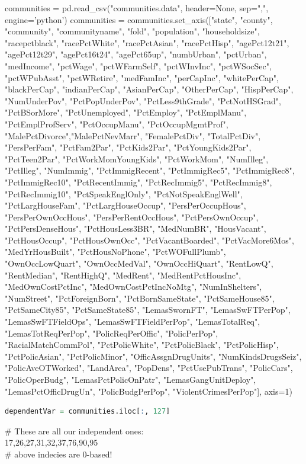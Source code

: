 \documentclass[10pt,a4paper]{article}
\begin{document}
communities = pd.read\_csv("communities.data", header=None, sep=",", engine='python')
communities = communities.set\_axis(["state", "county", "community", "communityname", "fold", "population", "householdsize", "racepctblack", "racePctWhite", "racePctAsian",
"racePctHisp", "agePct12t21", "agePct12t29", "agePct16t24", "agePct65up", "numbUrban", "pctUrban", "medIncome", "pctWage", "pctWFarmSelf", 
"pctWInvInc", "pctWSocSec", "pctWPubAsst", "pctWRetire", "medFamInc", "perCapInc",
"whitePerCap", "blackPerCap", "indianPerCap", "AsianPerCap", "OtherPerCap", "HispPerCap", "NumUnderPov", "PctPopUnderPov", "PctLess9thGrade",
"PctNotHSGrad", "PctBSorMore", "PctUnemployed", "PctEmploy", "PctEmplManu", "PctEmplProfServ", "PctOccupManu", "PctOccupMgmtProf", "MalePctDivorce","MalePctNevMarr", "FemalePctDiv", "TotalPctDiv", "PersPerFam", "PctFam2Par", "PctKids2Par", "PctYoungKids2Par", "PctTeen2Par", "PctWorkMomYoungKids",
"PctWorkMom", "NumIlleg", "PctIlleg", "NumImmig", "PctImmigRecent", "PctImmigRec5", "PctImmigRec8", "PctImmigRec10", "PctRecentImmig", "PctRecImmig5",
"PctRecImmig8", "PctRecImmig10", "PctSpeakEnglOnly", "PctNotSpeakEnglWell", "PctLargHouseFam", "PctLargHouseOccup", "PersPerOccupHous", "PersPerOwnOccHous",
"PersPerRentOccHous", "PctPersOwnOccup", "PctPersDenseHous", "PctHousLess3BR", "MedNumBR", "HousVacant", "PctHousOccup", "PctHousOwnOcc", "PctVacantBoarded", 
"PctVacMore6Mos", "MedYrHousBuilt", "PctHousNoPhone", "PctWOFullPlumb", "OwnOccLowQuart", "OwnOccMedVal", "OwnOccHiQuart", "RentLowQ", "RentMedian",
"RentHighQ", "MedRent", "MedRentPctHousInc", "MedOwnCostPctInc", "MedOwnCostPctIncNoMtg", "NumInShelters", "NumStreet", "PctForeignBorn", "PctBornSameState",
"PctSameHouse85", "PctSameCity85", "PctSameState85", "LemasSwornFT", "LemasSwFTPerPop", "LemasSwFTFieldOps", "LemasSwFTFieldPerPop", "LemasTotalReq", 
"LemasTotReqPerPop", "PolicReqPerOffic", "PolicPerPop", "RacialMatchCommPol", "PctPolicWhite", "PctPolicBlack", "PctPolicHisp", "PctPolicAsian", 
"PctPolicMinor", "OfficAssgnDrugUnits", "NumKindsDrugsSeiz", "PolicAveOTWorked", "LandArea", "PopDens", "PctUsePubTrans", "PolicCars", "PolicOperBudg", 
"LemasPctPolicOnPatr", "LemasGangUnitDeploy", "LemasPctOfficDrugUn", "PolicBudgPerPop", "ViolentCrimesPerPop"], axis=1)
\begin{lstlisting}[language=R]	
dependentVar = communities.iloc[:, 127]
\end{lstlisting}
\# These are all our independent ones:\\ 17,26,27,31,32,37,76,90,95\\
\# above indecies are 0-based!\\
\end{document}
